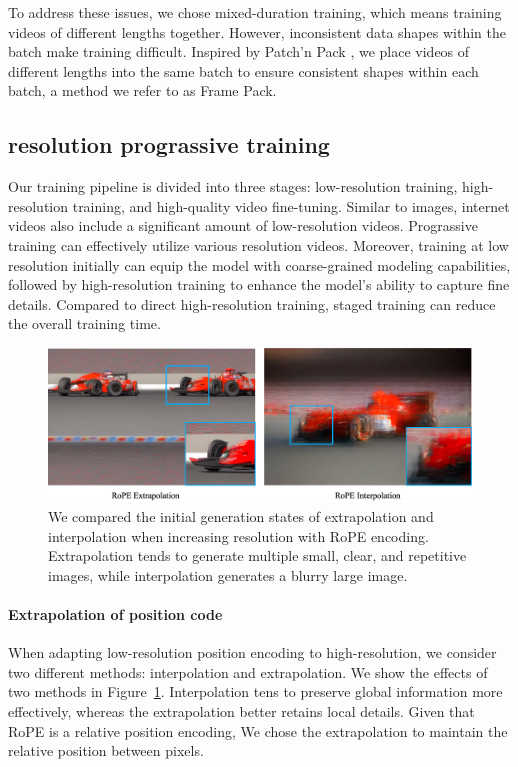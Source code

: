 To address these issues, we chose mixed-duration training, which means training videos of different lengths together. However, inconsistent data shapes within the batch make training difficult. Inspired by Patch'n Pack \citep{dehghani2024patch}, we place videos of different lengths into the same batch to ensure consistent shapes within each batch, a method we refer to as Frame Pack. 

\subsection{resolution prograssive training}
Our training pipeline is divided into three stages: low-resolution training, high-resolution training, and high-quality video fine-tuning. Similar to images, internet videos also include a significant amount of low-resolution videos. Prograssive training can effectively utilize various resolution videos. 
Moreover, training at low resolution initially can equip the model with coarse-grained modeling capabilities, followed by high-resolution training to enhance the model's ability to capture fine details. Compared to direct high-resolution training, staged training can reduce the overall training time.
\begin{figure}[h]
\begin{center}
\includegraphics[width=0.9\linewidth]{images/ive.png}
\end{center}
\caption{We compared the initial generation states of extrapolation and interpolation when increasing resolution with RoPE encoding. Extrapolation tends to generate multiple small, clear, and repetitive images, while interpolation generates a blurry large image.}
\label{fig:ive}
\end{figure}

\paragraph{Extrapolation of position code}
When adapting low-resolution position encoding to high-resolution, we consider two different methods: interpolation and extrapolation. We show the effects of two methods in Figure~\ref{fig:ive}. Interpolation tens to preserve global information more effectively, whereas the extrapolation better retains local details. Given that RoPE is a relative position encoding, We chose the extrapolation to maintain the relative position between pixels. 

